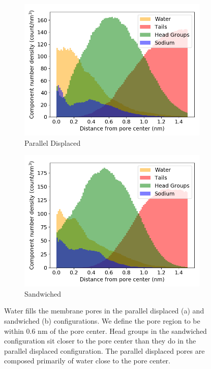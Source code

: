 \documentclass{article}
\begin{document}
  \begin{figure}
  \centering 
  \begin{subfigure}{0.45\textwidth}
        \includegraphics[width=1\linewidth]{offset_solvated_density.png}
        \caption{Parallel Displaced}
        \label{fig:offset_solvated_density}
  \end{subfigure}
  \begin{subfigure}{0.45\textwidth}
        \includegraphics[width=1\linewidth]{layered_solvated_density.png}
        \caption{Sandwiched}
        \label{fig:layered_solvated_density}
  \end{subfigure}
  \caption{Water fills the membrane pores in the parallel displaced (a) and
	  sandwiched (b) configurations. We define the pore region to be within 0.6 nm of
	  the pore center. Head groups in the sandwiched configuration sit closer to the
	  pore center than they do in the parallel displaced configuration. The parallel
	  displaced pores are composed primarily of water close to the pore center.}
  \label{fig:water_density}
  \end{figure}
\end{document}
